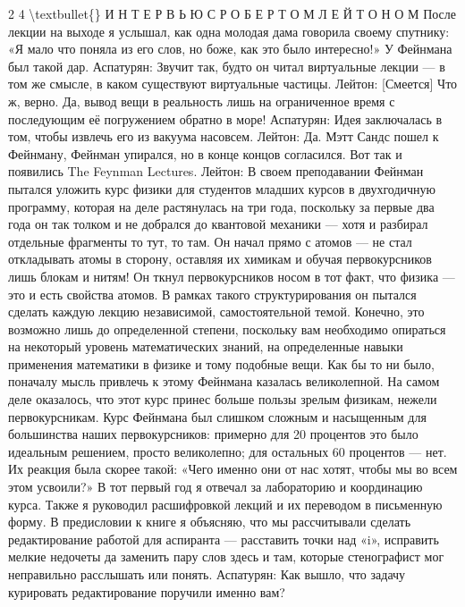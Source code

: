 \documentclass[10pt,oneside]{article}
\begin{document}
2 4 \textbackslash{}textbullet\{\} И Н Т Е Р В Ь Ю  С  Р О Б Е Р Т О М  Л Е Й Т О Н О М После лекции на выходе я услышал, как одна молодая дама говорила своему спутнику: «Я мало что поняла из его слов, но боже, как это было интересно!» У Фейнмана был такой дар. Аспатурян: Звучит так, будто он читал виртуальные лекции --- в том же смысле, в каком существуют виртуальные частицы. Лейтон: [Смеется] Что ж, верно. Да, вывод вещи в реальность лишь на ограниченное время с последующим её погружением обратно в море! Аспатурян: Идея заключалась в том, чтобы извлечь его из вакуума насовсем. Лейтон: Да. Мэтт Сандс пошел к Фейнману, Фейнман упирался, но в конце концов согласился. Вот так и появились The Feynman Lectures. Лейтон: В своем преподавании Фейнман пытался уложить курс физики для студентов младших курсов в двухгодичную программу, которая на деле растянулась на три года, поскольку за первые два года он так толком и не добрался до квантовой механики --- хотя и разбирал отдельные фрагменты то тут, то там. Он начал прямо с атомов --- не стал откладывать атомы в сторону, оставляя их химикам и обучая первокурсников лишь блокам и нитям! Он ткнул первокурсников носом в тот факт, что физика --- это и есть свойства атомов. В рамках такого структурирования он пытался сделать каждую лекцию независимой, самостоятельной темой. Конечно, это возможно лишь до определенной степени, поскольку вам необходимо опираться на некоторый уровень математических знаний, на определенные навыки применения математики в физике и тому подобные вещи. Как бы то ни было, поначалу мысль привлечь к этому Фейнмана казалась великолепной. На самом деле оказалось, что этот курс принес больше пользы зрелым физикам, нежели первокурсникам. Курс Фейнмана был слишком сложным и насыщенным для большинства наших первокурсников: примерно для 20 процентов это было идеальным решением, просто великолепно; для остальных 60 процентов --- нет. Их реакция была скорее такой: «Чего именно они от нас хотят, чтобы мы во всем этом усвоили?» В тот первый год я отвечал за лабораторию и координацию курса. Также я руководил расшифровкой лекций и их переводом в письменную форму. В предисловии к книге я объясняю, что мы рассчитывали сделать редактирование работой для аспиранта --- расставить точки над «i», исправить мелкие недочеты да заменить пару слов здесь и там, которые стенографист мог неправильно расслышать или понять. Аспатурян: Как вышло, что задачу курировать редактирование поручили именно вам?\par
\end{document}
